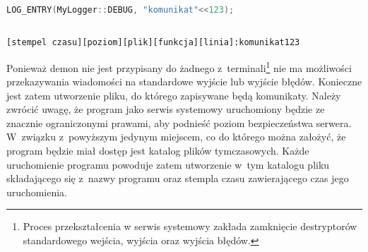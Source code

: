 \vspace{0.5cm}
\begin{minipage}{\textwidth}
  \begin{lstlisting}[language=c++, breaklines=true,
    linewidth=0.99\textwidth, caption=Przykładowe wypisanie
    komunikatu]

LOG_ENTRY(MyLogger::DEBUG, "komunikat"<<123);

\end{lstlisting}
\end{minipage}
\vspace{0.5cm}

\vspace{0.5cm}
\begin{minipage}{\textwidth}
\begin{lstlisting}[linewidth=0.99\textwidth, caption=Format komunikatu przekazywanego użytkownikowi]

[stempel czasu][poziom][plik][funkcja][linia]:komunikat123

\end{lstlisting}
\end{minipage}
\vspace{0.5cm}

Ponieważ demon nie jest przypisany do żadnego
z~terminali\footnote{Proces przekształcenia w serwis systemowy zakłada
  zamknięcie destryptorów standardowego wejścia, wyjścia oraz wyjścia
  błędów.} nie ma możliwości przekazywania wiadomości na standardowe
wyjście lub wyjście błędów. Konieczne jest zatem utworzenie pliku, do
którego zapisywane będą komunikaty. Należy zwrócić uwagę, że program
jako serwis systemowy uruchomiony będzie ze znacznie ograniczonymi
prawami, aby podnieść poziom bezpieczeństwa serwera. W~związku
z~powyższym jedynym miejscem, co do którego można założyć, że program
będzie miał dostęp jest katalog plików tymczasowych. Każde
uruchomienie programu powoduje zatem utworzenie w~tym katalogu pliku
składającego się z~nazwy programu oraz stempla czasu zawierającego
czas jego uruchomienia.
